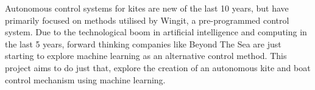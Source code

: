 Autonomous control systems for kites are new of the last 10 years, but have primarily focused on methods utilised by Wingit, a pre-programmed control system. Due to the technological boom in artificial intelligence and computing in the last 5 years, forward thinking companies like Beyond The Sea are just starting to explore machine learning as an alternative control method. This project aims to do just that, explore the creation of an autonomous kite and boat control mechanism using machine learning.